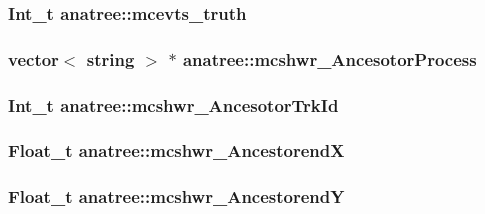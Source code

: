\hypertarget{classanatree_a6348c95823d70c20e4d6ab3d34dc2de5}{
\subsubsection[{mcevts\-\_\-truth}]{\setlength{\rightskip}{0pt plus 5cm}Int\-\_\-t anatree\-::mcevts\-\_\-truth}}\label{classanatree_a6348c95823d70c20e4d6ab3d34dc2de5}
\hypertarget{classanatree_aa5d90860444fade2049cb26233e1c2d0}{
\subsubsection[{mcshwr\-\_\-\-Ancesotor\-Process}]{\setlength{\rightskip}{0pt plus 5cm}vector$<$ string $>$ $\ast$ anatree\-::mcshwr\-\_\-\-Ancesotor\-Process}}\label{classanatree_aa5d90860444fade2049cb26233e1c2d0}
\hypertarget{classanatree_a3f8b1a07c09a37638c033854a54a8e68}{
\subsubsection[{mcshwr\-\_\-\-Ancesotor\-Trk\-Id}]{\setlength{\rightskip}{0pt plus 5cm}Int\-\_\-t anatree\-::mcshwr\-\_\-\-Ancesotor\-Trk\-Id}}\label{classanatree_a3f8b1a07c09a37638c033854a54a8e68}
\hypertarget{classanatree_a07f9cb0a1300bbb50fee3da98fc497d1}{
\subsubsection[{mcshwr\-\_\-\-Ancestorend\-X}]{\setlength{\rightskip}{0pt plus 5cm}Float\-\_\-t anatree\-::mcshwr\-\_\-\-Ancestorend\-X}}\label{classanatree_a07f9cb0a1300bbb50fee3da98fc497d1}
\hypertarget{classanatree_ad0fee09ac51f48a3c95ad66c317f1be2}{
\subsubsection[{mcshwr\-\_\-\-Ancestorend\-Y}]{\setlength{\rightskip}{0pt plus 5cm}Float\-\_\-t anatree\-::mcshwr\-\_\-\-Ancestorend\-Y}}\label{classanatree_ad0fee09ac51f48a3c95ad66c317f1be2}

